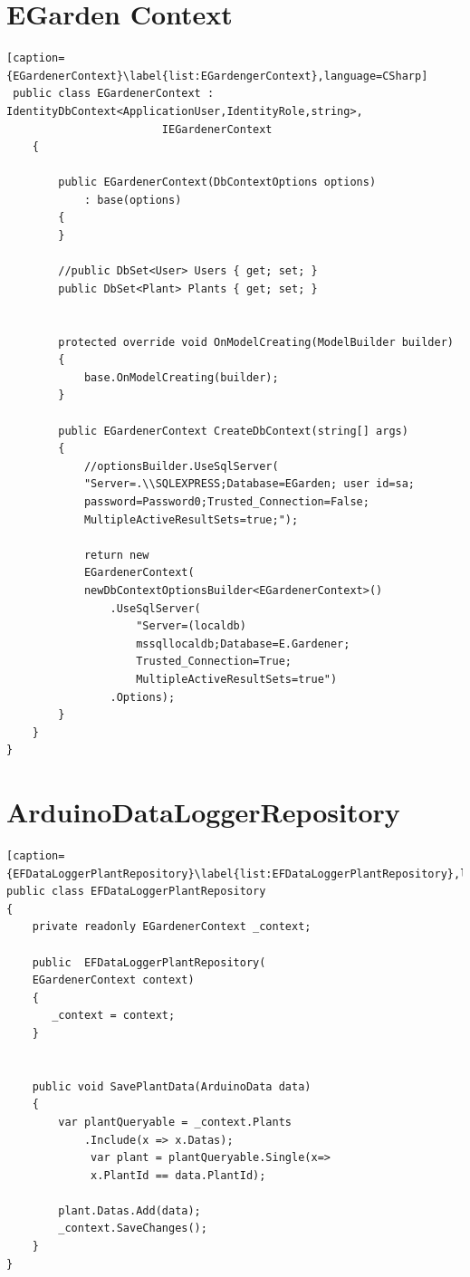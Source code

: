 \documentclass[a4paper,12pt,oneside,openright,titlepage]{book}
\begin{document}
\section{EGarden Context}
\begin{lstlisting}[caption={EGardenerContext}\label{list:EGardengerContext},language=CSharp]
 public class EGardenerContext : IdentityDbContext<ApplicationUser,IdentityRole,string>,
						IEGardenerContext
    {

        public EGardenerContext(DbContextOptions options)
            : base(options)
        {
        }

        //public DbSet<User> Users { get; set; }
        public DbSet<Plant> Plants { get; set; }


        protected override void OnModelCreating(ModelBuilder builder)
        {
            base.OnModelCreating(builder);
        }

        public EGardenerContext CreateDbContext(string[] args)
        {
            //optionsBuilder.UseSqlServer(
            "Server=.\\SQLEXPRESS;Database=EGarden; user id=sa;
            password=Password0;Trusted_Connection=False;
            MultipleActiveResultSets=true;");

            return new 
            EGardenerContext(
            newDbContextOptionsBuilder<EGardenerContext>()
                .UseSqlServer(
                    "Server=(localdb)
                    mssqllocaldb;Database=E.Gardener;
                    Trusted_Connection=True;
                    MultipleActiveResultSets=true")
                .Options);
        }
    }
}

\end{lstlisting}
\section{ArduinoDataLoggerRepository}
\begin{lstlisting}[caption={EFDataLoggerPlantRepository}\label{list:EFDataLoggerPlantRepository},language=CSharp]
public class EFDataLoggerPlantRepository
{
	private readonly EGardenerContext _context;

	public	EFDataLoggerPlantRepository(
	EGardenerContext context)
	{
       _context = context;
	}


	public void SavePlantData(ArduinoData data)
	{
		var plantQueryable = _context.Plants
			.Include(x => x.Datas);
             var plant = plantQueryable.Single(x=>
             x.PlantId == data.PlantId);
             
		plant.Datas.Add(data);
		_context.SaveChanges();
	}
}
\end{lstlisting}
\end{document}
